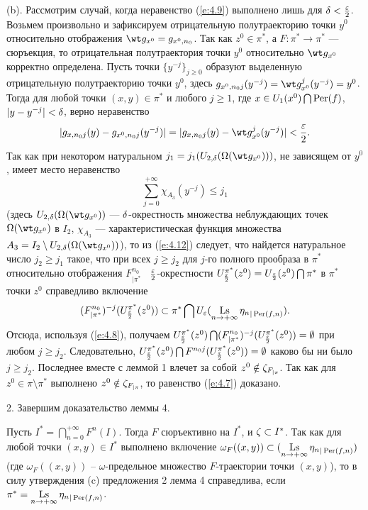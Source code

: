 \begin{pf}
(b). Рассмотрим случай, когда неравенство (\ref{e:4.9})
выполнено лишь для $\delta<\frac{\varepsilon}{2}$.
Возьмем произвольно и зафиксируем отрицательную полутраекторию
точки $y^0$ относительно отображения
$\wt g_{x^0}=g_{x^0, n_0}$. Так как $z^0\in \pi^*$, а
$F: \pi^*\to \pi^*$ --- сюръекция, то отрицательная полутраектория
точки $y^0$ относительно $\wt g_{x^0}$ корректно определена.
Пусть точки $\{y^{-j}\}_{j\geq 0}$ образуют выделенную отрицательную
полутраекторию точки $y^0$, здесь
$g_{x^0, n_0j}(y^{-j})=\wt g_{x^0}^j(y^{-j})=y^0$.
Тогда для любой точки $(x, y)\in \pi^*$ и любого $j\geq 1$, где
$x\in U_1(x^0)\bigcap \operatorname{Per}(f)$, $|y - y^{-j}|<\delta$,
верно неравенство
\begin{equation}\label{e:4.12}
|g_{x, n_0j}(y) - g_{x^0, n_0j}(y^{-j})|=
|g_{x, n_0j}(y) - \wt g_{x^0}^j(y^{-j})|<\frac{\e}{2}.
\end{equation}
Так как при
некотором натуральном $j_1=j_1(U_{2, \de}(\Omega(\wt g_{x^0})))$,
не зависящем от $y^0$,
имеет место неравенство
$$
\sum\limits_{j=0}^{+\infty}\chi_{A_3}(y^{-j})\leq j_1
$$
(здесь $U_{2, \de} (\Omega(\wt g_{x^0}))$
--- $\delta$-окрестность множества неблуждающих точек
$\Omega(\wt g_{x^0})$ в $I_2$,
$\chi_{A_3}$ ---
характеристическая функция множества
$A_3=I_2\setminus U_{2, \de}(\Omega(\wt g_{x^0}))$),
то из (\ref{e:4.12}) следует, что найдется натуральное
число $j_2\geq j_1$ такое, что при всех $j\geq j_2$
для $j$-го полного прообраза в $\pi^*$ относительно отображения
$F_{| \pi^*}^{n_0}$  \  $\frac{\varepsilon}{2}$-окрестности
$U_{\frac{\varepsilon}{2}}^{\pi^*}(z^0)=U_{\frac{\varepsilon}{2}}(z^0)\bigcap\pi^*$
в $\pi^*$ точки $z^0$ справедливо включение
$$
(F_{| \pi^*}^{n_0})^{-j}
(U_{\frac{\e}{2}}^{\pi^*}(z^0))\subset\pi^*\bigcap U_{\e}
(\Ls\limits_{n\to +\infty}{\eta_n}_{|\Per(f, n)}).
$$
Отсюда, используя (\ref{e:4.8}), получаем
$U_{\frac{\varepsilon}{2}}^{\pi^*}(z^0)\bigcap (F_{| \pi^*}^{n_0})^{-j}
(U_{\frac{\varepsilon}{2}}^{\pi^*}(z^0))=\emptyset$
при любом $j\geq j_2$. Следовательно,
$U_{\frac{\varepsilon}{2}}^{\pi^*}(z^0)\bigcap F^{n_0j}
(U_{\frac{\varepsilon}{2}}^{\pi^*}(z^0))=\emptyset$
каково бы ни было $j\geq j_2$.
Последнее вместе с леммой 1 влечет за собой
$z^0\notin\zeta_{F_{| \pi}}$.
Так как для $z^0\in\pi\setminus\pi^*$ выполнено
$z^0\notin\zeta_{F_{| \pi}}$, то
равенство (\ref{e:4.7}) доказано.

2. Завершим доказательство леммы 4.

Пусть $I^*=\bigcap\limits_{n=0}^{+\infty}F^n(I)$.
Тогда $F$ сюръективно на $I^*$, и $\zeta\subset I^*$.
Так как для любой точки $(x, y)\in I^*$ выполнено включение
$\omega_F((x, y))\subset(\Ls\limits_{n\to +\infty}
{\eta_n}_{| \Per(f, n)})$
(где $\omega_F((x, y))$ -- $\omega$-предельное множество
$F$-траектории точки $(x, y)$),
то в силу утверждения (c) предложения 2 лемма 4
справедлива, если
$\pi^*=\Ls\limits_{n\to
+\infty}{\eta_n}_{| \Per(f, n)}$.


\end{pf}
